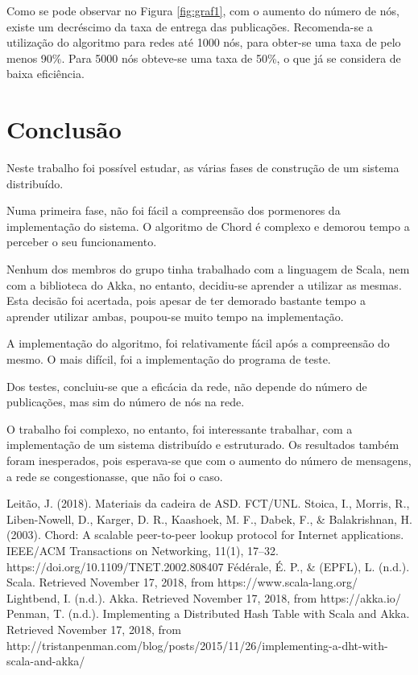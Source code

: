 \documentclass[12pt]{article}
\begin{document}
Como se pode observar no Figura \ref{fig:graf1}, com o aumento do número de nós, existe um decréscimo da taxa de entrega das publicações. Recomenda-se a utilização do algoritmo para redes até 1000 nós, para obter-se uma taxa de pelo menos 90\%. Para 5000 nós obteve-se uma taxa de 50\%, o que já se considera de baixa eficiência.

\newpage
\section{Conclusão}

Neste trabalho foi possível estudar, as várias fases de construção de um sistema distribuído.

Numa primeira fase, não foi fácil a compreensão dos pormenores da implementação do sistema. O algoritmo de Chord é complexo e demorou tempo a perceber o seu funcionamento.

Nenhum dos membros do grupo tinha trabalhado com a linguagem de Scala, nem com a biblioteca do Akka, no entanto, decidiu-se aprender a utilizar as mesmas. Esta decisão foi acertada, pois apesar de ter demorado bastante tempo a aprender utilizar ambas, poupou-se muito tempo na implementação.

A implementação do algoritmo, foi relativamente fácil após a compreensão do mesmo. O mais difícil, foi a implementação do programa de teste.

Dos testes, concluiu-se que a eficácia da rede, não depende do número de publicações, mas sim do número de nós na rede.

O trabalho foi complexo, no entanto, foi interessante trabalhar, com a implementação de um sistema distribuído e estruturado. Os resultados também foram inesperados, pois esperava-se que com o aumento do número de mensagens, a rede se congestionasse, que não foi o caso.

\newpage
\begin{thebibliography}{00}
 Leitão, J. (2018). Materiais da cadeira de ASD. FCT/UNL.
 Stoica, I., Morris, R., Liben-Nowell, D., Karger, D. R., Kaashoek, M. F., Dabek, F., \& Balakrishnan, H. (2003). Chord: A scalable peer-to-peer lookup protocol for Internet applications. IEEE/ACM Transactions on Networking, 11(1), 17–32. https://doi.org/10.1109/TNET.2002.808407
 Fédérale, É. P., \& (EPFL), L. (n.d.). Scala. Retrieved November 17, 2018, from https://www.scala-lang.org/
 Lightbend, I. (n.d.). Akka. Retrieved November 17, 2018, from https://akka.io/
 Penman, T. (n.d.). Implementing a Distributed Hash Table with Scala and Akka. Retrieved November 17, 2018, from http://tristanpenman.com/blog/posts/2015/11/26/implementing-a-dht-with-scala-and-akka/
\end{thebibliography}
\end{document}
